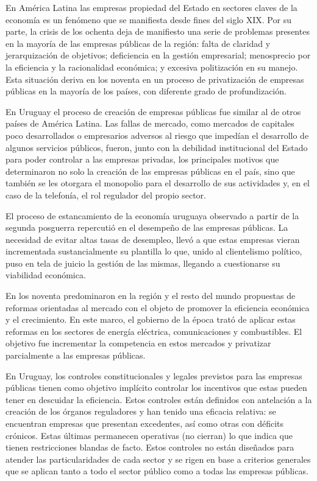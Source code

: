 \documentclass[
  12pt,
  spanish,
]{book}
\begin{document}
En América Latina las empresas propiedad del Estado en sectores claves de la economía es un fenómeno que se manifiesta desde fines del siglo XIX. Por su parte, la crisis de los ochenta deja de manifiesto una serie de problemas presentes en la mayoría de las empresas públicas de la región: falta de claridad y jerarquización de objetivos; deficiencia en la gestión empresarial; menosprecio por la eficiencia y la racionalidad económica; y excesiva politización en su manejo. Esta situación deriva en los noventa en un proceso de privatización de empresas públicas en la mayoría de los países, con diferente grado de profundización.

En Uruguay el proceso de creación de empresas públicas fue similar al de otros países de América Latina. Las fallas de mercado, como mercados de capitales poco desarrollados o empresarios adversos al riesgo que impedían el desarrollo de algunos servicios públicos, fueron, junto con la debilidad institucional del Estado para poder controlar a las empresas privadas, los principales motivos que determinaron no solo la creación de las empresas públicas en el país, sino que también se les otorgara el monopolio para el desarrollo de sus actividades y, en el caso de la telefonía, el rol regulador del propio sector.

El proceso de estancamiento de la economía uruguaya observado a partir de la segunda posguerra repercutió en el desempeño de las empresas públicas. La necesidad de evitar altas tasas de desempleo, llevó a que estas empresas vieran incrementada sustancialmente su plantilla lo que, unido al clientelismo político, puso en tela de juicio la gestión de las mismas, llegando a cuestionarse su viabilidad económica.

En los noventa predominaron en la región y el resto del mundo propuestas de reformas orientadas al mercado con el objeto de promover la eficiencia económica y el crecimiento. En este marco, el gobierno de la época trató de aplicar estas reformas en los sectores de energía eléctrica, comunicaciones y combustibles. El objetivo fue incrementar la competencia en estos mercados y privatizar parcialmente a las empresas públicas.

En Uruguay, los controles constitucionales y legales previstos para las empresas públicas tienen como objetivo implícito controlar los incentivos que estas pueden tener en descuidar la eficiencia. Estos controles están definidos con antelación a la creación de los órganos reguladores y han tenido una eficacia relativa: se encuentran empresas que presentan excedentes, así como otras con déficits crónicos. Estas últimas permanecen operativas (no cierran) lo que indica que tienen restricciones blandas de facto. Estos controles no están diseñados para atender las particularidades de cada sector y se rigen en base a criterios generales que se aplican tanto a todo el sector público como a todas las empresas públicas.
\end{document}
